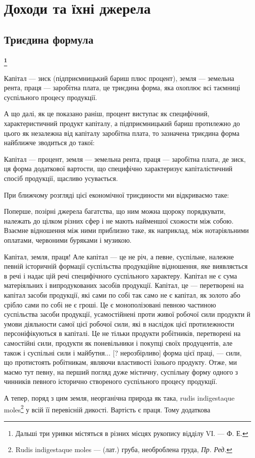 \chapter{Доходи та їхні джерела}

\section{Триєдина формула}

\subsubsection{\footnote{
Дальші три уривки містяться в різних місцях рукопису відділу VІ. — Ф. Е.
}}

Капітал — зиск (підприємницький бариш плюс процент), земля — земельна
рента, праця — заробітна плата, це триєдина форма, яка охоплює всі таємниці
суспільного процесу продукції.

А що далі, як це показано раніш, процент виступає як специфічний,
характеристичний продукт капіталу, а підприємницький бариш протилежно
до цього як незалежна від капіталу заробітна плата, то зазначена триєдина
форма найближче зводиться до такої:

Капітал — процент, земля — земельна рента, праця — заробітна плата, де зиск,
ця форма додаткової вартости, що специфічно характеризує капіталістичний спосіб
продукції, щасливо усувається.

При ближчому розгляді цієї економічної триєдиности ми відкриваємо таке:

Поперше, позірні джерела багатства, що ним можна щороку порядкувати,
належать до цілком різних сфер і не мають найменшої схожости між собою.
Взаємне відношення між ними приблизно таке, як наприклад, між нотаріяльними
оплатами, червоними буряками і музикою.

Капітал, земля, праця! Але капітал — це не річ, а певне, суспільне,
належне певній історичній формації суспільства продукційне відношення, яке
виявляється в речі і надає цій речі специфічного суспільного характеру. Капітал
не є сума матеріяльних і випродукованих засобів продукції. Капітал, це —
перетворені на капітал засоби продукції, які сами по собі так само не є капітал,
як золото або срібло сами по собі не є гроші. Це є монополізовані певною
частиною суспільства засоби продукції, усамостійнені проти живої робочої сили
продукти й умови діяльности самої цієї робочої сили, які в наслідок цієї протилежности
персоніфікуються в капіталі. Це не тільки продукти робітників,
перетворені на самостійні сили, продукти як поневільники і покупці своїх продуцентів,
але також і суспільні сили і майбутня... [? нерозбірливо] форма цієї
праці, — сили, що протистоять робітникам, являючи властивості їхнього продукту.
Отже, ми маємо тут певну, на перший погляд дуже містичну, суспільну форму
одного з чинників певного історично створеного суспільного процесу продукції.

А тепер, поряд з цим земля, неорганічна природа як така, rudis indigestaque
moles\footnote*{
Rudis indigestaque moles — (лат.) груба, необроблена груда, \emph{Пр. Ред.}
} у всій її перевісній дикості. Вартість є праця. Тому додаткова
\parbreak{}  %
